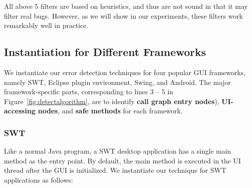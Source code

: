 All above 5 filters are based on heuristics, and thus are not sound in
that it may filter real bugs. However, as we will show in
our experiments, these filters work remarkably well in practice.


\subsection{Instantiation for Different Frameworks}
\label{sec:platforms}

We instantiate our error detection techniques for four popular GUI frameworks,
namely SWT, Eclipse plugin environment, Swing, and Android.
The major framework-specific parts, corresponding to
lines 3 -- 5 in Figure~\ref{fig:detectalgorithm}, are to identify
\textbf{call graph entry nodes}), \textbf{UI-accessing nodes},
and \textbf{safe methods} for each framework.





\subsubsection{SWT}

Like a normal Java program, a SWT desktop application
has a single main method as the entry point. By default,
the main method is executed in the UI thread after the GUI
is initialized. We instantiate our technique for SWT applications as follows:


